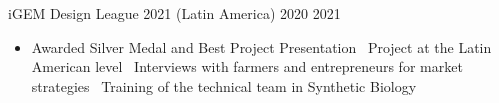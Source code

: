 \documentclass{simplecv}
\newcommand{\mydot}{\raisebox{0.5 ex}{.}\ }
\begin{document}
    {iGEM Design League 2021 (Latin America)}
    {}
    {2020}
    {2021}
    {%
        \vspace{-11pt}
        \begin{itemize}[leftmargin=*]
        \setlength{\itemsep}{0cm}
          \item Awarded Silver Medal and Best Project Presentation \mydot Project at the Latin American level \mydot Interviews with farmers and entrepreneurs for market strategies \mydot Training of the technical team in Synthetic Biology
        \end{itemize}
    }

\newpage

\printbibliography[heading=none]
    
\end{document}
